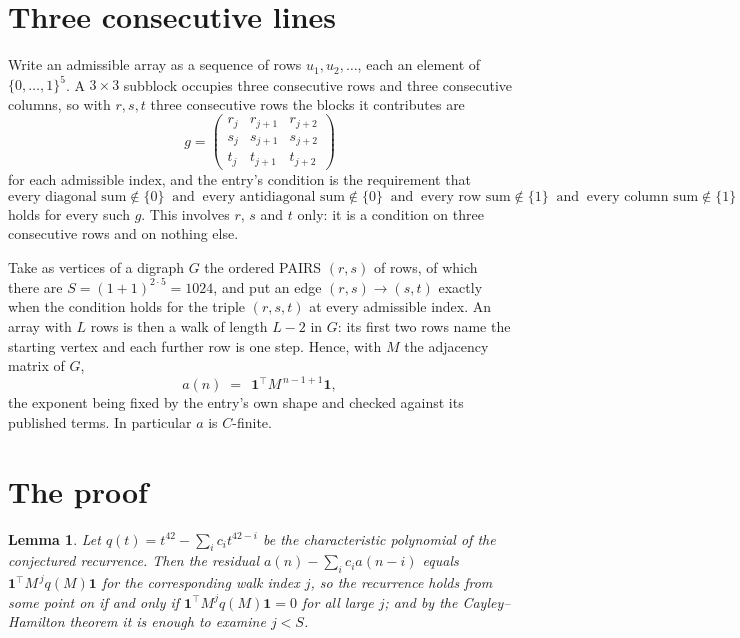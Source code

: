 \documentclass[11pt,a4paper]{article}
\theoremstyle{plain}
\newtheorem{lemma}[theorem]{Lemma}
\theoremstyle{definition}
\begin{document}
\section{Three consecutive lines}

Write an admissible array as a sequence of rows $u_1,u_2,\dots$, each an element of
$\{0,\dots,1\}^{5}$. A $3\times3$ subblock occupies three consecutive rows and
three consecutive columns, so with $r,s,t$ three consecutive rows the blocks it
contributes are
\[
g=\begin{pmatrix}r_j&r_{j+1}&r_{j+2}\\ s_j&s_{j+1}&s_{j+2}\\ t_j&t_{j+1}&t_{j+2}\end{pmatrix}
\]
for each admissible index, and the entry's condition is the requirement that
\[
\text{every diagonal sum} \notin \{0\}\ \text{ and }\ \text{every antidiagonal sum} \notin \{0\}\ \text{ and }\ \text{every row sum} \notin \{1\}\ \text{ and }\ \text{every column sum} \notin \{1\}
\]
holds for every such $g$. This involves $r$, $s$ and $t$ only: it is a condition on
three consecutive rows and on nothing else.

Take as vertices of a digraph $G$ the ordered PAIRS $(r,s)$ of rows, of which there are
$S=(1+1)^{2\cdot5}=1024$, and put an edge $(r,s)\to(s,t)$ exactly when the condition
holds for the triple $(r,s,t)$ at every admissible index. An array with $L$ rows is then a
walk of length $L-2$ in $G$: its first two rows name the starting vertex and each further
row is one step. Hence, with $M$ the adjacency matrix of $G$,
\[
a(n)\;=\;\,\mathbf{1}^{\!\top}M^{\,n-1+1}\mathbf{1},
\]
the exponent being fixed by the entry's own shape and checked against its published terms.
In particular $a$ is $C$-finite.

\section{The proof}

\begin{lemma}\label{lem:crit}
Let $q(t)=t^{42}-\sum_i c_it^{42-i}$ be the characteristic polynomial of the
conjectured recurrence. Then the residual $a(n)-\sum_ic_ia(n-i)$ equals
$\mathbf{1}^{\!\top}M^{\,j}q(M)\mathbf{1}$ for the corresponding walk index
$j$, so the recurrence holds from some point on if and only if
$\mathbf{1}^{\!\top}M^{j}q(M)\mathbf{1}=0$ for all large $j$; and by the
Cayley--Hamilton theorem it is enough to examine $j<S$.
\end{lemma}
\end{document}
